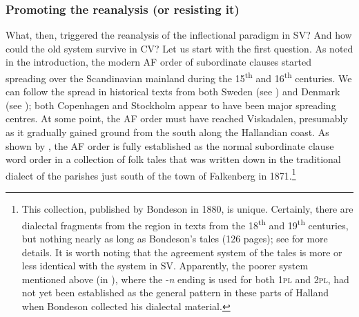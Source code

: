 \documentclass[output=paper,colorlinks,citecolor=brown,draft,draftmode]{langscibook}
\begin{document}
\subsubsection{Promoting the reanalysis (or resisting it)}\label{sec:petzell:4.3.3}\largerpage[1.5]


What, then, triggered the reanalysis of the inflectional paradigm in SV? And how could the old system survive in CV? Let us start with the first question. As noted in the introduction, the modern AF order of subordinate clauses started spreading over the Scandinavian mainland during the 15\textsuperscript{th} and 16\textsuperscript{th} centuries. We can follow the spread in historical texts from both Sweden (see \citealt{Falk1993}) and Denmark (see \citealt{Sundquist2003}); both Copenhagen and Stockholm appear to have been major spreading centres. At some point, the AF order must have reached Viskadalen, presumably as it gradually gained ground from the south along the Hallandian coast. As shown by \citet{Petzell2018}, the AF order is fully established as the normal subordinate clause word order in a collection of folk tales that was written down in the traditional dialect of the parishes just south of the town of Falkenberg in 1871.\footnote{This collection, published by Bondeson in 1880, is unique. Certainly, there are dialectal fragments from the region in texts from the 18\textsuperscript{th} and 19\textsuperscript{th} centuries, but nothing nearly as long as Bondeson’s tales (126 pages); see \citet{Petzell2018} for more details. It is worth noting that the agreement system of the tales is more or less identical with the system in SV. Apparently, the poorer system mentioned above (in ), where the -\textit{n} ending is used for both 1\textsc{pl} and 2\textsc{pl}, had not yet been established as the general pattern in these parts of Halland when Bondeson collected his dialectal material.}
\end{document}
